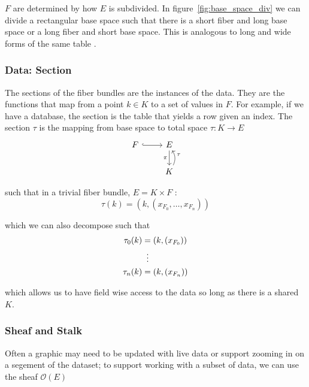\documentclass[../main.tex]{subfiles}
\begin{document}
$F$ are determined by how $E$ is subdivided\cite{QuotientSpaceTopology2020,QuotientSpaceTopology2020}. In figure~\ref{fig:base_space_div} we can divide a rectangular base space such that there is a short fiber and long base space or a long fiber and short base space. This is analogous to long and wide forms of the same table \cite{wickham2014tidy}.

\subsubsection{Data: Section}
\label{sec:section_data}
The sections of the fiber bundles are the instances of the data. They are the functions that map from a point $k \in K$ to a set of values in $F$. For example, if we have a database, the section is the table that yields a row given an index. The section $\tau$ is the mapping from base space to total space $\tau: K\rightarrow E$ 
\begin{equation}
    \label{eq:section}
    \begin{tikzcd}
        F \arrow[r, hook] & E \arrow[d, "\pi"']           \\
        & K \arrow[u, "\tau"', bend right]
    \end{tikzcd}
\end{equation}

such that in a trivial fiber bundle, $E = K \times F$ \cite{rowlandFiberBundle,FiberBundle2020}:
\begin{equation}
    \label{eq:section_return}
    \tau(k) = (k, (x_{F_{0}}, \ldots, x_{F_{n}}))
\end{equation}

which we can also decompose such that
\begin{align}
\tau_{0}(k) &= (k, (x_{F_{0}}))\\
            & \vdotswithin{=}\\
\tau_{n}(k) &= (k, (x_{F_{n}}))
\end{align}

which allows us to have field wise access to the data so long as there is a shared $K$.  

\subsubsection{Sheaf and Stalk}
Often a graphic may need to be updated with live data or support zooming in on a segement of the dataset; to support working with a subset of data, we can use the sheaf $\mathcal{O}(E)$
\end{document}

